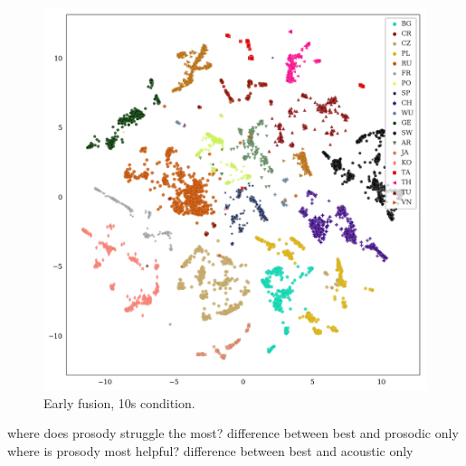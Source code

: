 \documentclass[bsc,frontabs,twoside,singlespacing,parskip,deptreport]{infthesis}
\begin{document}
{  \begin{figure}[h!]
    \centering
    \includegraphics[width=\textwidth]{../img/tsne-mfcc_deltas_pitch_energy.png}
    \caption{Early fusion, 10s condition.}
    \label{fig:summary-early-10s}
  \end{figure}

  where does prosody struggle the most? difference between best and prosodic only
  where is prosody most helpful? difference between best and acoustic only


}
\end{document}
